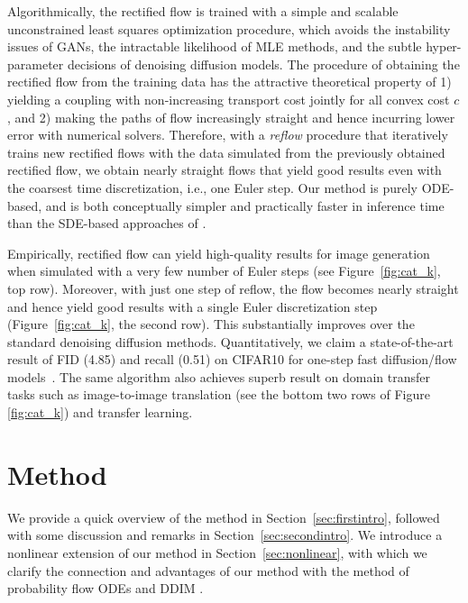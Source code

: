 \documentclass[11pt]{article}
\begin{document}
Algorithmically, the rectified flow 
is trained with 
a simple and scalable unconstrained 
least squares optimization procedure,    which 
avoids the instability issues of GANs,  
the intractable likelihood of MLE methods, and the subtle hyper-parameter decisions of denoising diffusion models.  
The procedure of obtaining the rectified flow from the training data has the attractive theoretical property of 
1) yielding a coupling with 
non-increasing transport cost jointly for all convex cost $c$, 
and 2) making the paths of flow increasingly straight and hence incurring lower error with numerical solvers.
Therefore, 
with a \emph{reflow} 
procedure that iteratively trains new 
rectified flows
with the data simulated from the previously obtained rectified flow, 
we obtain nearly straight flows 
that yield good results even with
the coarsest time discretization, i.e., 
one Euler step. 
Our method is purely ODE-based, 
and is both conceptually simpler and practically faster in inference time than the SDE-based approaches of
\cite{ho2020denoising, song2020score, song2020denoising}. 

Empirically, 
rectified flow 
can yield
high-quality results 
for image generation when simulated with a very few number of Euler steps (see Figure~\ref{fig:cat_k}, top row).
Moreover, with just one step of reflow, 
the flow becomes nearly straight and hence yield good results with a single Euler discretization step (Figure~\ref{fig:cat_k}, the second row).
This substantially improves 
over the standard denoising diffusion methods. %
Quantitatively, we claim a state-of-the-art result of FID (4.85) and recall (0.51) on CIFAR10 for one-step fast diffusion/flow models~\citep{bao2022analytic, lyu2022accelerating, xiao2021tackling, zheng2022truncated, luhman2021knowledge}. 
The same algorithm 
also achieves superb result on domain transfer tasks such as image-to-image translation (see the bottom two rows of Figure \ref{fig:cat_k}) and 
transfer learning. 






  


\section{Method} 
We provide a quick overview of the method in Section~\ref{sec:firstintro}, 
followed with some discussion and remarks in Section~\ref{sec:secondintro}. 
We introduce a nonlinear extension of our method in Section~\ref{sec:nonlinear}, 
with which we clarify the connection and advantages of our method with the method of probability flow ODEs \citep{song2020score} and DDIM \citep{song2020denoising}. 
\end{document}
